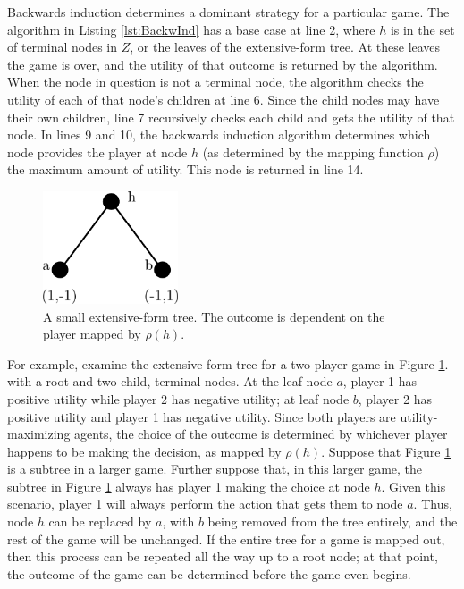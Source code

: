 Backwards induction determines a dominant strategy for a particular game. The algorithm in Listing \ref{lst:BackwInd} has a base case at line 2, where $h$ is in the set of terminal nodes in $Z$, or the leaves of the extensive-form tree. At these leaves the game is over, and the utility of that outcome is returned by the algorithm. When the node in question is not a terminal node, the algorithm checks the utility of each of that node's children at line 6. Since the child nodes may have their own children, line 7 recursively checks each child and gets the utility of that node. In lines 9 and 10, the backwards induction algorithm determines which node provides the player at node $h$ (as determined by the mapping function $\rho$) the maximum amount of utility. This node is returned in line 14.\\

\begin{figure}[H]
  \centering
  \includegraphics[width=4cm]{figures/ExampleBackwardInduction.png}
  \caption{A small extensive-form tree. The outcome is dependent on the player mapped by $\rho(h)$.}
  \label{fig:BackwardInduction}
\end{figure}

For example, examine the extensive-form tree for a two-player game in Figure \ref{fig:BackwardInduction}. with a root and two child, terminal nodes. At the leaf node $a$, player 1 has positive utility while player 2 has negative utility; at leaf node $b$, player 2 has positive utility and player 1 has negative utility. Since both players are utility-maximizing agents, the choice of the outcome is determined by whichever player happens to be making the decision, as mapped by $\rho(h)$. Suppose that Figure \ref{fig:BackwardInduction} is a subtree in a larger game. Further suppose that, in this larger game, the subtree in Figure \ref{fig:BackwardInduction} always has player 1 making the choice at node $h$. Given this scenario, player 1 will always perform the action that gets them to node $a$. Thus, node $h$ can be replaced by $a$, with $b$ being removed from the tree entirely, and the rest of the game will be unchanged. If the entire tree for a game is mapped out, then this process can be repeated all the way up to a root node; at that point, the outcome of the game can be determined before the game even begins.\\

